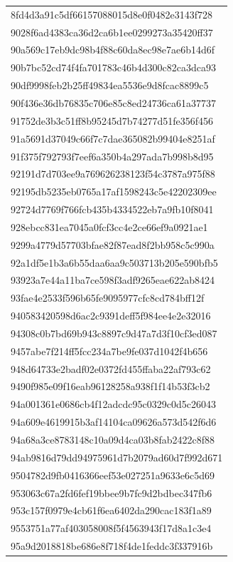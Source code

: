 \begin{tabular}{l}
8fd4d3a91c5df66157088015d8e0f0482e3143f728 \\
9028f6ad4383ca36d2ca6b1ee0299273a35420ff37 \\
90a569c17eb9dc98b4f88c60da8ec98e7ae6b14d6f \\
90b7bc52cd74f4fa701783c46b4d300c82ca3dca93 \\
90df9998feb2b25ff49834ea5536e9d8fcac8899c5 \\
90f436e36db76835c706e85c8ed24736ca61a37737 \\
91752de3b3c51ff8b95245d7b74277d51fe356f456 \\
91a5691d37049c66f7c7dae365082b99404e8251af \\
91f375f792793f7eef6a350b4a297ada7b998b8d95 \\
92191d7d703ee9a769626238123f54c3787a975f88 \\
92195db5235eb0765a17af1598243c5e42202309ee \\
92724d7769f766fcb435b4334522eb7a9fb10f8041 \\
928ebcc831ea7045a0fcf3cc4e2ce66ef9a0921ae1 \\
9299a4779d57703bfae82f87ead8f2bb958c5c990a \\
92a1df5e1b3a6b55daa6aa9c503713b205e590bfb5 \\
93923a7e44a11ba7ce598f3adf9265eae622ab8424 \\
93fae4e2533f596b65fe9095977cfc8cd784bff12f \\
940583420598d6ac2c9391deff5f984ee4e2e32016 \\
94308c0b7bd69b943c8897c9d47a7d3f10cf3ed087 \\
9457abe7f214ff5fcc234a7be9fe037d1042f4b656 \\
948d64733e2badf02e0372fd455ffaba22af793c62 \\
9490f985e09f16eab96128258a938f1f14b53f3cb2 \\
94a001361e0686cb4f12adcdc95c0329c0d5c26043 \\
94a609e4619915b3af14104ca09626a573d542f6d6 \\
94a68a3ce8783148c10a09d4ca03b8fab2422c8f88 \\
94ab9816d79dd94975961d7b2079ad60d7f992d671 \\
9504782d9fb0416366eef53e027251a9633e6c5d69 \\
953063c67a2fd6fef19bbee9b7fc9d2bdbec347fb6 \\
953c157f0979e4cb61f6ea6402da290cac183f1a89 \\
9553751a77af403058008f5f4563943f17d8a1c3e4 \\
95a9d2018818be686e8f718f4de1feddc3f337916b \\

\end{tabular}
